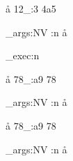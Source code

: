 \documentclass[12pt]{article}
\begin{document}
\begin{filecontentsdefxmacro}{\aa}
12_:3
4a5%
\end{filecontentsdefxmacro}


\prettystop

\ExplSyntaxOn

\exp_args:NV \pretty:n \aa

\precattl_exec:n{
\def \FCDtabtomacro {\cO\^^I}
}

\begin{filecontentsdefxmacro}{\aa}
	78_:a9
78%
\end{filecontentsdefxmacro}
\exp_args:NV \pretty:n \aa


\begin{filecontentsdefxmacro}{\aa}
 78_:a9
78%
\end{filecontentsdefxmacro}
\exp_args:NV \pretty:n \aa


\ExplSyntaxOff
\end{document}
